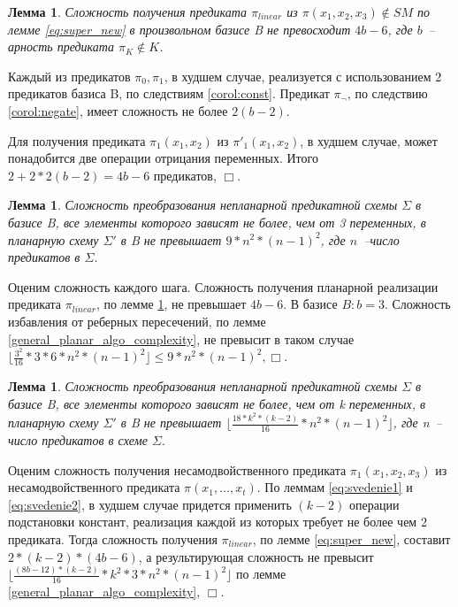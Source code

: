 \documentclass[12pt]{extarticle}
\newtheorem{lemma}[theorem]{Лемма}
\newenvironment{proof}[1][Доказательство.]{\begin{trivlist}
\item[\hskip \labelsep {\bfseries #1}]}{\end{trivlist}}
\begin{document}
\begin{lemma}
\label{complexity}
Сложность получения предиката $\pi_{linear}$ из $\pi(x_1, x_2, x_3) \notin SM$ по лемме \ref{eq:super_new}
в произвольном базисе B не 
превосходит $4b - 6$, где $b$~-- арность предиката $\pi_K \notin K$.
\end{lemma}
\begin{proof}
Каждый из предикатов $\pi_0, \pi_1$, в худшем случае, реализуется с использованием 2 предикатов базиса B,
по следствиям \ref{corol:const}. Предикат $\pi_{\neg}$, по следствию \ref{corol:negate}, имеет сложность не более $2(b-2)$.

Для получения предиката  $\pi_1(x_1, x_2)$ из $\pi'_1(x_1, x_2)$, в худшем случае, может понадобится 
две операции отрицания переменных.
Итого $2 + 2 * 2(b-2) = 4b - 6$ предикатов, $\Box$.
\end{proof}

\begin{lemma}
Сложность преобразования непланарной предикатной схемы $\Sigma$ в базисе B, 
все элементы которого зависят не более, чем от 3 переменных, 
в планарную схему $\Sigma'$ в B не превышает $9 * n^2 * (n-1)^2$, где $n$~--число предикатов в $\Sigma$.
\end{lemma}
\begin{proof}
Оценим сложность каждого шага. Сложность получения планарной реализации предиката $\pi_{linear}$, по лемме \ref{complexity},
не превышает $4b - 6$. В базисе $B: b=3$. Сложность избавления от реберных пересечений, по лемме \ref{general_planar_algo_complexity}, не 
превысит в таком случае $\lfloor \frac{3^2}{16} * 3 * 6 * n^2 * (n-1)^2 \rfloor \le 9 * n^2 * (n-1)^2, \Box$.
\end{proof}

\begin{lemma}
Сложность преобразования непланарной предикатной схемы $\Sigma$ в базисе B, 
все элементы которого зависят не более, чем от k переменных, 
в планарную схему $\Sigma'$ в B не превышает $\lfloor \frac{18 * k^2 * (k-2)}{16} * n^2 * (n-1)^2 \rfloor$, где n~-- число предикатов в схеме $\Sigma$.
\end{lemma}
\begin{proof}
Оценим сложность получения несамодвойственного предиката $\pi_1(x_1, x_2, x_3)$ из несамодвойственного предиката
$\pi(x_1, \dots, x_t)$. По леммам \ref{eq:svedenie1} и \ref{eq:svedenie2}, в худшем случае придется применить $(k-2)$ 
операции подстановки констант, реализация каждой из которых требует не более чем 2 предиката.
Тогда сложность получения $\pi_{linear}$, по лемме \ref{eq:super_new}, составит $2 * (k-2) * (4b - 6)$, а
результирующая сложность не превысит $\lfloor \frac{(8b - 12) * (k-2)}{16} * k^2 * 3 * n^2 * (n-1)^2 \rfloor $ по лемме 
\ref{general_planar_algo_complexity}, $\Box$.
\end{proof}
\end{document}
